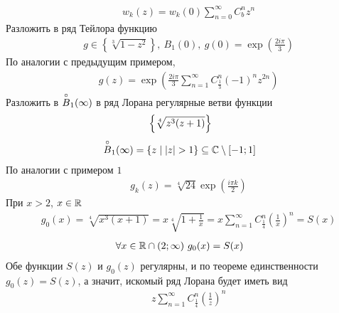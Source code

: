 \begin{align*}
  & w_k(z) = w_k(0)\sum_{n=0}^\infty C_b^nz^n
\end{align*}
\Example
Разложить в ряд Тейлора функцию
\begin{align*}
  & g \in \left\{ \sqrt[3]{1-z^2} \right\}, \ B_1(0), \ g(0) = \exp \left( \frac{2 i \pi}{3} \right)
\end{align*}
\nonum
По аналогии с предыдущим примером,
\begin{align*}
  & g(z) = \exp \left( \frac{2 i \pi}{3}\sum_{n=1}^\infty C_{\frac{1}{3}}^n(-1)^n z^{2n} \right)
\end{align*}
\Example
Разложить в $\overset{\circ}{B}_1(\infty)$ в ряд Лорана регулярные ветви функции
\begin{align*}
  & \left\{{\sqrt[4]{z^3(z+1)}}\right\}
\end{align*}
\nonum
\begin{align*}
  & \overset{\circ}{B}_1(\infty) = \left\{ z \mid \left| z \right| > 1\right\}\subseteq \mathbb{C} \setminus [-1;1]
\end{align*}
По аналогии с примером $1$
\begin{align*}
  & g_k(z) = \sqrt[4]{24}\exp \left( \frac{i\pi k}{2} \right)
\end{align*}
При $x > 2$, $x \in \mathbb{R}$
\begin{align*}
  & g_0(x) = \sqrt[4]{x^3(x+1)} = x \sqrt[4]{1+\frac{1}{x}} = x \sum_{n=1}^\infty C_{\frac{1}{4}}^n\left( \frac{1}{x} \right)^n = S(x)
\end{align*}
\begin{align*}
  & \forall x \in \mathbb{R} \cap (2; \infty) \ g_0(x) = S(x)
\end{align*}
Обе функции $S(z)$ и $g_0(z)$ регулярны, и по теореме единственности $g_0(z) =
S(z)$, а значит, искомый ряд Лорана будет иметь вид
\begin{align*}
  & z \sum_{n=1}^\infty C_{\frac{1}{4}}^n\left( \frac{1}{z} \right)^n
\end{align*}
